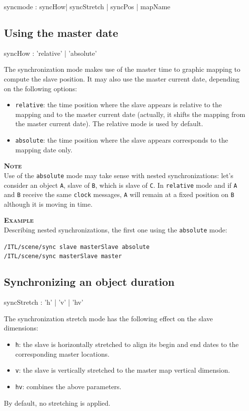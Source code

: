 \documentclass[a4paper,twoside]{report}
\newcommand{\subsublevel}[1]	{\subsection{#1}}
\newcommand{\OSC}[1]		{\texttt{#1}}
\newcommand{\values}[1]	{\texttt{#1}}
\newcommand{\example}		{\textbf{\hspace{-1.5cm}\textbf{\textsc{Example }}}}
\newcommand{\note}	[1]		{\vspace{2mm}\textbf{\hspace{-1.03cm}\textbf{\textsc{Note #1}}}}
\newcommand{\sample}	[1]			{\vspace{-2mm}\begin{center}\colorbox{mygrey}{
								\begin{minipage}[t]{0.9\columnwidth} 
								{\small \texttt{#1}}
								\end{minipage}}\end{center}}
\begin{document}
\begin{rail}
syncmode : syncHow| syncStretch | syncPos | mapName
\end{rail}

\subsublevel{Using the master date}
\begin{rail}
syncHow : 'relative' | 'absolute'
\end{rail}

The synchronization mode makes use of the master time to graphic mapping to compute the slave position. It may also use the master current date, depending on the following options:
\begin{itemize}
\item \OSC{relative}: the time position where the slave appears is relative to the mapping and to the master current date (actually, it shifts the mapping from the master current date). The relative mode is used by default.
\item \OSC{absolute}: the time position where the slave appears corresponds to the mapping date only.
\end{itemize}

\note{} \\
Use of the \OSC{absolute} mode may take sense with nested synchronizations: let's consider an object \values{A}, slave of \values{B}, which is slave of \values{C}.
In \OSC{relative} mode and if \values{A} and \values{B} receive the same \OSC{clock} messages, \values{A} will remain at a fixed position on \values{B} although it is moving in time.

\example \\
Describing nested synchronizations, the first one using the \OSC{absolute} mode:
\sample{/ITL/scene/sync slave masterSlave absolute \\
/ITL/scene/sync masterSlave master
}

\subsublevel{Synchronizing an object duration}

\begin{rail}
syncStretch : 'h' | 'v' | 'hv'
\end{rail}

The synchronization stretch mode has the following effect on the slave dimensions:
\begin{itemize}
\item \OSC{h}: the slave is horizontally stretched to align its begin and end dates to the corresponding master locations.
\item \OSC{v}: the slave is vertically stretched to the master map vertical dimension.
\item \OSC{hv}: combines the above parameters.
\end{itemize}
By default, no stretching is applied.
\end{document}
